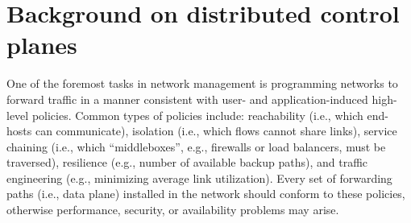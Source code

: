 \section{Background on distributed control planes} \label{sec:motivation}


One of the foremost tasks in network management is programming 
networks to forward traffic in a manner consistent with user- and
application-induced high-level policies. Common types of policies
include: reachability (i.e., which end-hosts can communicate),
isolation (i.e., which flows cannot share links), service chaining
(i.e., which ``middleboxes'', e.g., firewalls or load
balancers, must be traversed), resilience (e.g., number of available backup paths), and traffic engineering (e.g., minimizing average
link utilization). Every set of forwarding paths (i.e., data plane)
installed in the network
should conform to these 
policies, otherwise performance, security, or availability problems may arise.

